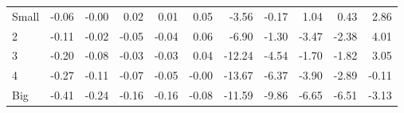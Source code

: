 \begin{table}[!ht]
\begin{tabular}{lrrrrrrrrrr}
    \\
      \cmidrule(r){2-6} \cmidrule(r){7-11}

    Small   & -0.06  & -0.00  & 0.02  & 0.01  & 0.05  & -3.56  & -0.17  & 1.04  & 0.43  & 2.86  \\
         2  & -0.11  & -0.02  & -0.05  & -0.04  & 0.06  & -6.90  & -1.30  & -3.47  & -2.38  & 4.01  \\
         3  & -0.20  & -0.08  & -0.03  & -0.03  & 0.04  & -12.24  & -4.54  & -1.70  & -1.82  & 3.05  \\
         4  & -0.27  & -0.11  & -0.07  & -0.05  & -0.00  & -13.67  & -6.37  & -3.90  & -2.89  & -0.11  \\
    Big     & -0.41  & -0.24  & -0.16  & -0.16  & -0.08  & -11.59  & -9.86  & -6.65  & -6.51  & -3.13  \\

  

  \bottomrule
\end{tabular}
\label{tbl:25_Size_Var_C1997}
\end{table}